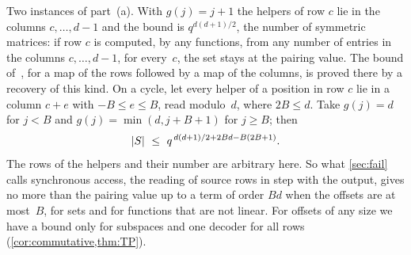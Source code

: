 Two instances of part~(a). With $g(j)=j+1$ the helpers of row $c$ lie in the columns $c,\dots,d-1$ and the bound is
$q^{d(d+1)/2}$, the number of symmetric matrices: if row $c$ is computed, by any functions, from any number of entries
in the columns $c,\dots,d-1$, for every~$c$, the set stays at the pairing value. The bound
of~\cite[Proposition~K.5]{SharedDecoders2026}, for a map of the rows followed by a map of the columns, is proved
there by a recovery of this kind. On a
cycle, let every helper of a position in row $c$ lie in a column $c+e$ with $-B\le e\le B$, read modulo~$d$, where
$2B\le d$. Take $g(j)=d$ for $j<B$ and $g(j)=\min(d,j+B+1)$ for $j\ge B$; then
\[
  \card S\ \le\ q^{\,d(d+1)/2+2Bd-B(2B+1)} .
\]
The rows of the helpers and their number are arbitrary here. So what \cref{sec:fail} calls synchronous access, the
reading of source rows in step with the output, gives no more than the pairing value up to a term of order $Bd$ when
the offsets are at most~$B$, for sets and for functions that are not linear. For offsets of any size we have a
bound only for subspaces and one decoder for all rows (\cref{cor:commutative,thm:TP}).

